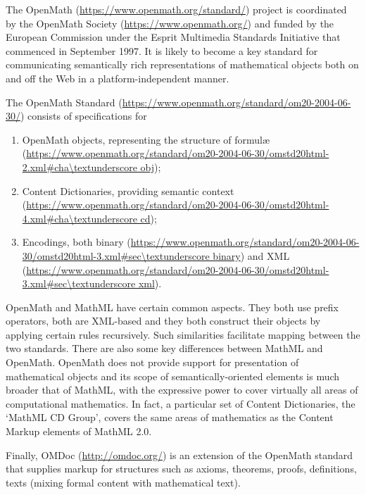 The OpenMath (\url{https://www.openmath.org/standard/}) project is coordinated by the OpenMath Society (\url{https://www.openmath.org/}) and funded by the European Commission under the Esprit Multimedia Standards Initiative that commenced in September 1997. It is likely to become a key standard for communicating semantically rich representations of mathematical objects both on and off the Web in a platform-independent manner.\par
The OpenMath Standard (\url{https://www.openmath.org/standard/om20-2004-06-30/}) consists of specifications for \begin{enumerate}
\item OpenMath objects, representing the structure of formulæ (\url{https://www.openmath.org/standard/om20-2004-06-30/omstd20html-2.xml\#cha\textunderscore obj});
\item Content Dictionaries, providing semantic context (\url{https://www.openmath.org/standard/om20-2004-06-30/omstd20html-4.xml\#cha\textunderscore cd});
\item Encodings, both binary (\url{https://www.openmath.org/standard/om20-2004-06-30/omstd20html-3.xml\#sec\textunderscore binary}) and XML (\url{https://www.openmath.org/standard/om20-2004-06-30/omstd20html-3.xml\#sec\textunderscore xml}).
\end{enumerate}\par
OpenMath and MathML have certain common aspects. They both use prefix operators, both are XML-based and they both construct their objects by applying certain rules recursively. Such similarities facilitate mapping between the two standards. There are also some key differences between MathML and OpenMath. OpenMath does not provide support for presentation of mathematical objects and its scope of semantically-oriented elements is much broader that of MathML, with the expressive power to cover virtually all areas of computational mathematics. In fact, a particular set of Content Dictionaries, the ‘MathML CD Group’, covers the same areas of mathematics as the Content Markup elements of MathML 2.0.\par
Finally, OMDoc (\url{http://omdoc.org/}) is an extension of the OpenMath standard that supplies markup for structures such as axioms, theorems, proofs, definitions, texts (mixing formal content with mathematical text).\par
